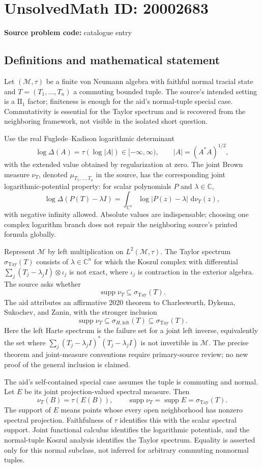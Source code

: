 \documentclass[11pt]{article}
\newcommand{\C}{\mathbb{C}}
\newcommand{\dd}{\,\mathrm{d}}
\begin{document}
\section*{UnsolvedMath ID: 20002683}
\textbf{Source problem code:} catalogue entry
\subsection{Definitions and mathematical statement}
Let \((\mathcal M,\tau)\) be a finite von Neumann algebra with faithful normal tracial state and \(T=(T_1,\ldots,T_n)\) a commuting bounded tuple. The source's intended setting is a \(\mathrm{II}_1\) factor; finiteness is enough for the aid's normal-tuple special case. Commutativity is essential for the Taylor spectrum and is recovered from the neighboring framework, not visible in the isolated short question.

Use the real Fuglede--Kadison logarithmic determinant
\[
 \log\Delta(A)=\tau(\log|A|)\in[-\infty,\infty),\qquad |A|=(A^*A)^{1/2},
\]
with the extended value obtained by regularization at zero. The joint Brown measure \(\nu_T\), denoted \(\mu_{T_1,\ldots,T_n}\) in the source, has the corresponding joint logarithmic-potential property: for scalar polynomials \(P\) and \(\lambda\in\C\),
\[
 \log\Delta(P(T)-\lambda I)=
 \int_{\C^n}\log|P(z)-\lambda|\,\dd\nu_T(z),
\]
with negative infinity allowed. Absolute values are indispensable; choosing one complex logarithm branch does not repair the neighboring source's printed formula globally.

Represent \(\mathcal M\) by left multiplication on \(L^2(\mathcal M,\tau)\). The Taylor spectrum \(\sigma_{\mathrm{Tay}}(T)\) consists of \(\lambda\in\C^n\) for which the Koszul complex with differential \(\sum_j(T_j-\lambda_jI)\otimes\iota_j\) is not exact, where \(\iota_j\) is contraction in the exterior algebra. The source asks whether
\[
 \operatorname{supp}\nu_T\subseteq\sigma_{\mathrm{Tay}}(T).
\]
The aid attributes an affirmative 2020 theorem to Charlesworth, Dykema, Sukochev, and Zanin, with the stronger inclusion
\[
 \operatorname{supp}\nu_T\subseteq\sigma_{H,\mathrm{left}}(T)
 \subseteq\sigma_{\mathrm{Tay}}(T).
\]
Here the left Harte spectrum is the failure set for a joint left inverse, equivalently the set where \(\sum_j(T_j-\lambda_jI)^*(T_j-\lambda_jI)\) is not invertible in \(\mathcal M\). The precise theorem and joint-measure conventions require primary-source review; no new proof of the general inclusion is claimed.

The aid's self-contained special case assumes the tuple is commuting and normal. Let \(E\) be its joint projection-valued spectral measure. Then
\[
 \nu_T(B)=\tau(E(B)),\qquad
 \operatorname{supp}\nu_T=\operatorname{supp}E
 =\sigma_{\mathrm{Tay}}(T).
\]
The support of \(E\) means points whose every open neighborhood has nonzero spectral projection. Faithfulness of \(\tau\) identifies this with the scalar spectral support. Joint functional calculus identifies the logarithmic potentials, and the normal-tuple Koszul analysis identifies the Taylor spectrum. Equality is asserted only for this normal subclass, not inferred for arbitrary commuting nonnormal tuples.
\end{document}
